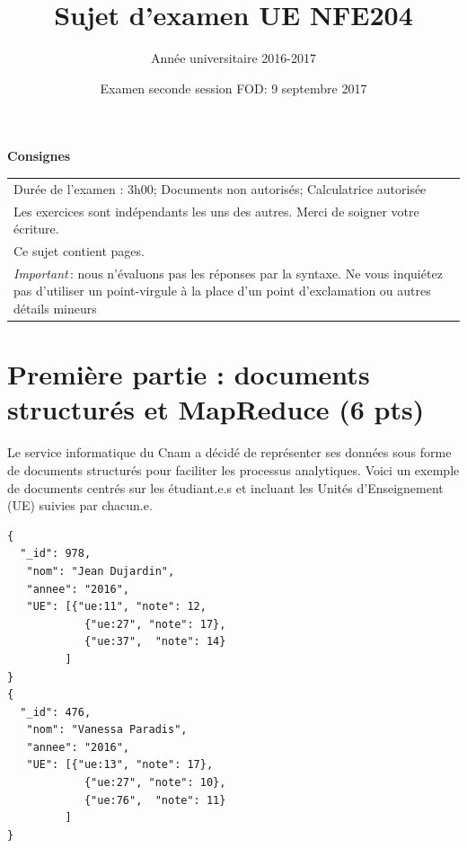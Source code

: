\documentclass[11pt,a4paper]{article}
\begin{document}
\title{Sujet d'examen UE NFE204}
\author{Année universitaire 2016-2017}
\date{Examen seconde session FOD: 9 septembre 2017}

\maketitle

\begin{center}
{\bf \Large Consignes}\\
\begin{tabular}{| p{15cm} |}
\hline
Dur\'ee de l'examen : 3h00; Documents non autoris\'es;  Calculatrice autoris\'ee\\

Les exercices sont indépendants les uns des autres. Merci de soigner votre écriture.\\
Ce sujet contient \pageref{LastPage} pages.\\

\textit{Important}\,: nous n'évaluons pas les réponses par la syntaxe. Ne vous
inquiétez pas d'utiliser un point-virgule à la place d'un point d'exclamation ou
autres détails mineurs
\\
\hline
\end{tabular}
\end{center}



\section*{Première partie : documents structurés et MapReduce (6 pts)}

Le service informatique du Cnam a décidé de représenter ses données sous forme de documents
structurés pour faciliter les processus analytiques. Voici un exemple de documents
centrés sur les étudiant.e.s et incluant les Unités d'Enseignement (UE) suivies
par chacun.e.

\begin{verbatim}
{
  "_id": 978,
   "nom": "Jean Dujardin",
   "annee": "2016",
   "UE": [{"ue:11", "note": 12,
            {"ue:27", "note": 17},
            {"ue:37",  "note": 14} 
         ]
}
{
  "_id": 476,
   "nom": "Vanessa Paradis",
   "annee": "2016",
   "UE": [{"ue:13", "note": 17},
            {"ue:27", "note": 10},
            {"ue:76",  "note": 11} 
         ]
}
\end{verbatim}
\end{document}
